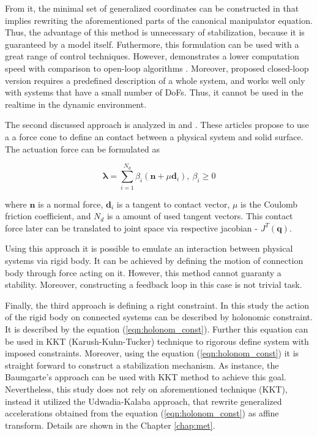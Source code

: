 From it, the minimal set of generalized coordinates can be constructed in that 
implies rewriting the aforementioned parts of the canonical manipulator equation.
Thus, the advantage of this method is unnecessary of stabilization, because 
it is guaranteed by a model itself. Futhermore, this formulation can be 
used with a great range of control techniques. However, \cite{BodyDynWithClosedLoop} 
demonstrates a lower computation speed with comparison to 
open-loop algorithms \cite{Pinocchio}. Moreover, proposed closed-loop 
version requires a predefined description of a whole system, and works well 
only with systems that have a small number of DoFs. Thus, it cannot 
be used in the realtime in the dynamic environment.

The second discussed approach is analyzed in \cite{OptimizationBasedLocomotionPlanning} 
and \cite{WholeBodyControlForm}. These articles propose to use a 
a force cone to define an contact between a physical system 
and solid surface. The actuation force can be formulated as 

\begin{equation}
    \label{eqn:force_cone}
    \pmb{\lambda} = \sum_{i=1}^{N_d} \beta_i (\mathbf{n} + \mu \mathbf{d}_i), 
    \: \beta_i \ge 0
\end{equation}

where $\mathbf{n}$ is a normal force, $\mathbf{d}_i$ is a tangent to contact 
vector, $\mu$ is the Coulomb friction coefficient, and $N_d$ is a amount
of used tangent vectors. This contact force later can be translated to 
joint space via respective jacobian - $J^T(\mathbf{q})$.

Using this approach it is possible to emulate an interaction between 
physical systems via rigid body. It can be achieved by defining the motion 
of connection body through force acting on it. However, this method cannot 
guaranty a stability. Moreover, constructing a feedback loop in this case is 
not trivial task. 

Finally, the third approach is defining a right constraint. In this study the action 
of the rigid body on connected systems can be described by holonomic constraint. 
It is described by the equation (\ref{eqn:holonom_const}).
Further this equation can be used in KKT (Karush-Kuhn-Tucker) technique to 
rigorous define system with imposed constraints. Moreover, using the equation
(\ref{eqn:holonom_const}) it is straight forward to construct a stabilization 
mechanism. As instance, the Baumgarte's approach can be used with KKT method 
to achieve this goal. Nevertheless, this study does not rely on aforementioned 
technique (KKT), instead it utilized the Udwadia-Kalaba approach, that 
rewrite generalized accelerations obtained from the equation 
(\ref{eqn:holonom_const}) as affine transform. Details are shown in the 
Chapter \ref{chap:met}.

